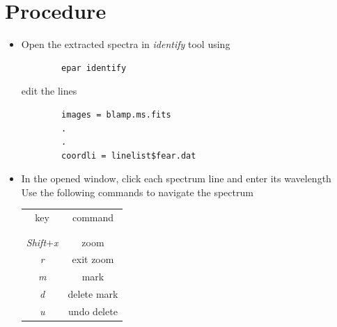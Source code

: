 \documentclass[letterpaper,11pt]{report}
\begin{document}
\section{Procedure}
\begin{itemize}
    \item Open the extracted spectra in \emph{identify} tool using
        \begin{lstlisting}
        epar identify
        \end{lstlisting}
    edit the lines
         \begin{lstlisting}
        images = blamp.ms.fits
        .
        .
        coordli = linelist$fear.dat
        \end{lstlisting}
    \item In the opened window, click each spectrum line and enter its wavelength\\ Use the following commands to navigate the spectrum
        \begin{table}[h!]
            \centering
            \begin{tabular}{c|c}
                key & command \\\\
                \hline \\
                 \emph{Shift}+\emph{x} & zoom  \\
                 \emph{r} & exit zoom \\
                 \emph{m} & mark \\
                 \emph{d} & delete mark \\
                 \emph{u} & undo delete \\
                 
            \end{tabular}
            

\end{table}
\end{itemize}
\end{document}
